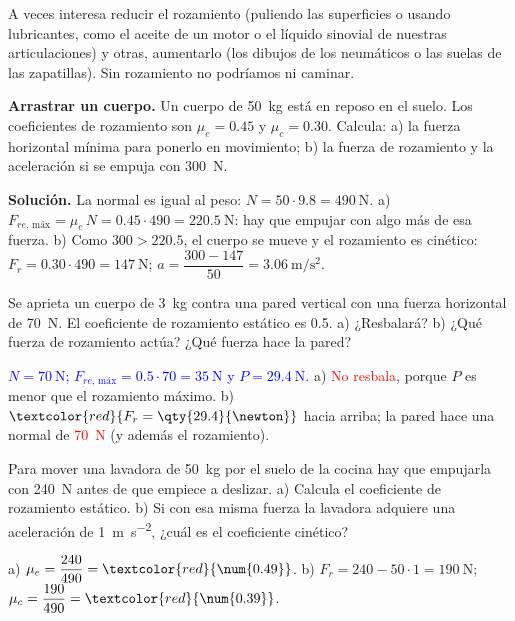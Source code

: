 \begin{remark}
    A veces interesa reducir el rozamiento (puliendo las superficies o usando lubricantes, como el aceite de un motor o el líquido
    sinovial de nuestras articulaciones) y otras, aumentarlo (los dibujos de los neumáticos o las suelas de las zapatillas). Sin
    rozamiento no podríamos ni caminar.
\end{remark}

\begin{example}
    \textbf{Arrastrar un cuerpo.} Un cuerpo de \qty{50}{\kg} está en reposo en el suelo. Los coeficientes de rozamiento son
    \(\mu_e = \num{0.45}\) y \(\mu_c = \num{0.30}\). Calcula: a) la fuerza horizontal mínima para ponerlo en movimiento; b) la fuerza de
    rozamiento y la aceleración si se empuja con \qty{300}{\newton}.

    \textbf{Solución.} La normal es igual al peso: \(N = 50 \cdot \num{9.8} = \qty{490}{\newton}\).
    a) \(F_{re,\,\text{máx}} = \mu_e\,N = \num{0.45} \cdot 490 = \qty{220.5}{\newton}\): hay que empujar con algo más de esa fuerza.
    b) Como \(300 > \num{220.5}\), el cuerpo se mueve y el rozamiento es cinético: \(F_r = \num{0.30} \cdot 490 = \qty{147}{\newton}\);
    \(a = \dfrac{300 - 147}{50} = \qty{3.06}{\m\per\s\squared}\).
\end{example}

\begin{exercise}
    Se aprieta un cuerpo de \qty{3}{\kg} contra una pared vertical con una fuerza horizontal de \qty{70}{\newton}. El coeficiente de
    rozamiento estático es \num{0.5}. a) ¿Resbalará? b) ¿Qué fuerza de rozamiento actúa? ¿Qué fuerza hace la pared?
    \begin{solu}
        \textcolor{blue}{\(N = \qty{70}{\newton}\); \(F_{re,\,\text{máx}} = \num{0.5} \cdot 70 = \qty{35}{\newton}\) y \(P = \qty{29.4}{\newton}\).}
        a) \textcolor{red}{No resbala}, porque \(P\) es menor que el rozamiento máximo. b) \(\textcolor{red}{F_r = \qty{29.4}{\newton}}\)
        hacia arriba; la pared hace una normal de \textcolor{red}{\qty{70}{\newton}} (y además el rozamiento).
    \end{solu}
\end{exercise}

\begin{exercise}
    Para mover una lavadora de \qty{50}{\kg} por el suelo de la cocina hay que empujarla con \qty{240}{\newton} antes de que empiece
    a deslizar. a) Calcula el coeficiente de rozamiento estático. b) Si con esa misma fuerza la lavadora adquiere una aceleración de
    \qty{1}{\m\per\s\squared}, ¿cuál es el coeficiente cinético?
    \begin{solu}
        a) \(\mu_e = \dfrac{240}{490} = \textcolor{red}{\num{0.49}}\). b) \(F_r = 240 - 50 \cdot 1 = \qty{190}{\newton}\);
        \(\mu_c = \dfrac{190}{490} = \textcolor{red}{\num{0.39}}\).
    \end{solu}
\end{exercise}

